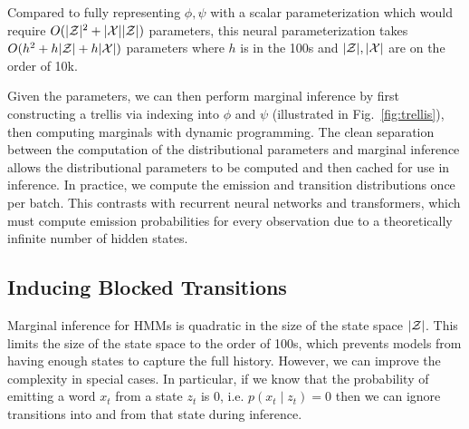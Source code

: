 \documentclass[11pt,a4paper]{article}
\begin{document}
Compared to fully representing $\phi,\psi$ with a scalar parameterization
which would require $O(|\mathcal{Z}|^2 + |\mathcal{X}||\mathcal{Z}|)$ parameters,
this neural parameterization takes $O(h^2 + h|\mathcal{Z}| + h|\mathcal{X}|)$ parameters
where $h$ is in the 100s and $|\mathcal{Z}|,|\mathcal{X}|$ are on the order of 10k.

Given the parameters, we can then perform marginal inference
by first constructing a trellis
via indexing into $\phi$ and $\psi$ (illustrated in Fig.~\ref{fig:trellis}),
then computing marginals with dynamic programming.
The clean separation between the computation of the distributional parameters and marginal inference
allows the distributional parameters to be computed and then cached for use in inference.
In practice,  we compute the emission and transition distributions once per batch.
This contrasts with recurrent neural networks and transformers,
which must compute emission probabilities for every observation
due to a theoretically infinite number of hidden states.

\subsection{Inducing Blocked Transitions}
Marginal inference for HMMs is quadratic in the size of the state space $|\mathcal{Z}|$.
This limits the size of the state space to the order of 100s,
which prevents models from having enough states to capture the full history.
However, we can improve the complexity in special cases.
In particular, if we know that the probability of emitting a word $x_t$ from a state $z_t$ is 0,
i.e. $p(x_t \mid z_t) = 0$  then we can ignore transitions into and from that state during inference. 
\end{document}
